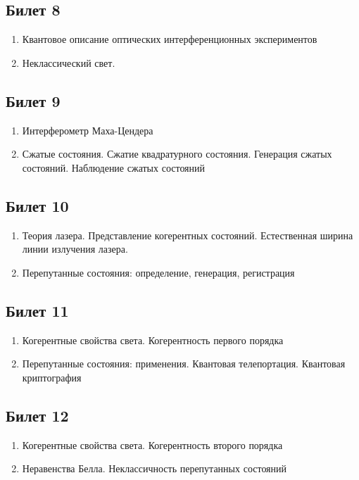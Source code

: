 \documentclass[12pt,a4paper]{article}
\begin{document}
\subsection*{Билет 8} 
\begin{enumerate}
\item Квантовое описание оптических интерференционных экспериментов
\item Неклассический свет.
\end{enumerate}

\subsection*{Билет 9} 
\begin{enumerate}
\item Интерферометр Маха-Цендера
\item Сжатые состояния. Сжатие квадратурного состояния. Генерация
  сжатых состояний. Наблюдение сжатых состояний
\end{enumerate}

\subsection*{Билет 10} 
\begin{enumerate}
\item Теория лазера. Представление когерентных состояний. Естественная
  ширина линии излучения лазера.
\item Перепутанные состояния: определение, генерация, регистрация
\end{enumerate}

\subsection*{Билет 11} 
\begin{enumerate}
\item Когерентные свойства света. Когерентность первого порядка
\item Перепутанные состояния: применения. Квантовая
  телепортация. Квантовая криптография
\end{enumerate}

\subsection*{Билет 12} 
\begin{enumerate}
\item Когерентные свойства света. Когерентность второго порядка
\item Неравенства Белла. Неклассичность перепутанных состояний
\end{enumerate}
\end{document}
